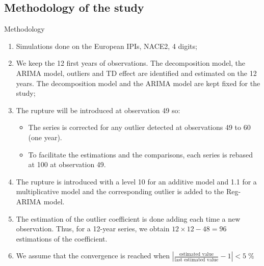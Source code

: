 \documentclass[10pt, handout]{beamer}
\begin{document}
\subsection{Methodology of the study}
\begin{frame}{Methodology}

\begin{enumerate}
	\item Simulations done on the European IPIs, NACE2, 4 digits;
	\item We keep the 12 first years of observations. The decomposition model, the ARIMA model, outliers and TD effect are identified and estimated on the 12 years. The decomposition model and the ARIMA model are kept fixed for the study;
	\item<2-> The rupture will be introduced at observation 49 so:
	\begin{itemize}
	  \item<2-> The series is corrected for any outlier detected at observations 49 to 60 (one year).
	  \item<2-> To facilitate the estimations and the comparisons, each series is rebased at 100 at observation 49.
	\end{itemize}
	\item<3-> The rupture is introduced with a level 10 for an additive model and 1.1 for a multiplicative model  and the corresponding outlier is added to the Reg-ARIMA model.
	\item<3-> The estimation of the outlier coefficient is done adding each time a new observation. Thus, for a 12-year series, we obtain $12 \times 12 - 48 = 96$ estimations of the coefficient.
	\item<4-> We assume that the convergence is reached when $\left\lvert\frac{\text{estimated value}}{\text{last estimated value}}-1\right\rvert < 5\;\%$
\end{enumerate}
\end{frame}
\end{document}

